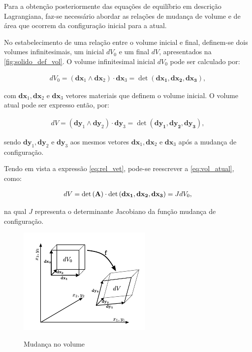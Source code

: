 Para a obtenção posteriormente das equações de equilíbrio em descrição Lagrangiana, faz-se necessário abordar as relações de mudança de volume e de área que ocorrem da configuração inicial para a atual. 

No estabelecimento de uma relação entre o volume inicial e final, definem-se dois volumes infinitesimais, um inicial $dV_{0}$ e um final $dV$, apresentados na \autoref{fig:solido_def_vol}. O volume infinitesimal inicial $dV_{0}$ pode ser calculado por:

\begin{align}
dV_{0} = (\mathbf{dx}_{1} \wedge \mathbf{dx}_{2}) \cdot \mathbf{dx}_{3} = \det{(\mathbf{dx_1},\mathbf{dx_2},\mathbf{dx_3})},
\end{align}

\noindent com $\mathbf{dx}_1,\mathbf{dx}_2$ e $\mathbf{dx}_3$ vetores materiais que definem o volume inicial. O volume atual pode ser expresso então, por:

\begin{align}
dV = (\mathbf{dy}_{1} \wedge \mathbf{dy}_{2}) \cdot \mathbf{dy}_{3} = \det{(\mathbf{dy_1},\mathbf{dy_2},\mathbf{dy_3})}, \label{eq:vol_atual}
\end{align}

\noindent  sendo $\mathbf{dy}_1,\mathbf{dy}_2$ e $\mathbf{dy}_3$ aos mesmos vetores $\mathbf{dx}_1,\mathbf{dx}_2$ e $\mathbf{dx}_3$ após a mudança de configuração.

Tendo em vista a expressão \ref{eq:rel_vet}, pode-se reescrever a \autoref{eq:vol_atual}, como:

\begin{align}
dV = \det{\left(\mathbf{A}\right)} \cdot \det{(\mathbf{dx_1},\mathbf{dx_2},\mathbf{dx_3})}  = JdV_{0} \label {eq:vol_atual2},
\end{align}

\noindent na qual $J$ representa o determinante Jacobiano da função mudança de configuração.

\begin{figure}[!htbp]
	\caption{Mudança no volume}
	\centering
	\includegraphics[scale=2.0]{Imagens/Cap4/sol_def_vol.pdf}	
	\label{fig:solido_def_vol}
\end{figure}

